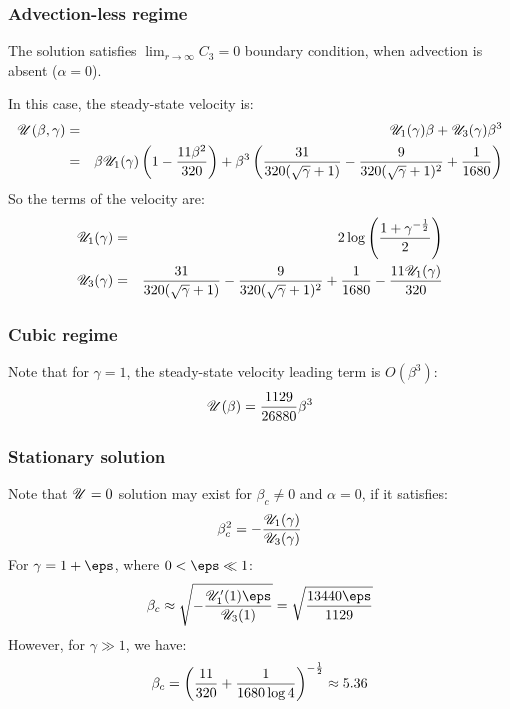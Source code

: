 \subsubsection{Advection-less regime}
The solution satisfies $\lim_{r\rightarrow\infty}C_3 = 0$ boundary condition, 
when advection is absent ($\alpha = 0$).

In this case, the steady-state velocity is:
\begin{eqnarray}
\mathscr{U}(\beta, \gamma) &=& \mathscr{U}_1(\gamma) \beta + \mathscr{U}_3(\gamma) \beta^3 \\ &=&
\beta \mathscr{U}_1(\gamma) \left(1 - \frac{11\beta^2}{320}\right) + 
\beta^3 \left(\frac{31}{320(\sqrt\gamma + 1)} - \frac{9}{320(\sqrt\gamma + 1)^2} + \frac{1}{1680}\right)
\end{eqnarray}
So the terms of the velocity are:
\begin{eqnarray}
\mathscr{U}_1(\gamma) &=& 2 \log \left(\frac{1 + \gamma^{-\frac{1}{2}}}{2}\right) \\
\mathscr{U}_3(\gamma) &=& \frac{31}{320(\sqrt\gamma + 1)} - \frac{9}{320(\sqrt\gamma + 1)^2} + \frac{1}{1680} - \frac{11 \mathscr{U}_1(\gamma)}{320}
\end{eqnarray}

\subsubsection{Cubic regime}
Note that for $\gamma = 1$, the steady-state velocity leading term is $O(\beta^3)$:
\begin{eqnarray}
\mathscr{U}(\beta) = \frac{1129}{26880}\beta^3
\end{eqnarray}

\subsubsection{Stationary solution}
Note that $\mathscr{U} = 0$ solution may exist for $\beta_c \ne 0$ and $\alpha = 0$, 
if it satisfies:
\begin{eqnarray}
\beta_c^2 = -\frac{\mathscr{U}_1(\gamma)}{\mathscr{U}_3(\gamma)}
\end{eqnarray}
For $\gamma = 1 + \eps$, where $0 < \eps \ll 1$:
\begin{eqnarray}
\beta_c \approx \sqrt{-\frac{\cU_1'(1) \eps}{\cU_3(1)}} = 
 \sqrt{\frac{13440 \eps}{1129}}
\end{eqnarray}
However, for $\gamma \gg 1$, we have:
\begin{eqnarray}
\beta_c =  \left(\frac{11}{320} + \frac{1}{1680 \log 4}\right)^{-\frac{1}{2}} \approx 5.36
\end{eqnarray}